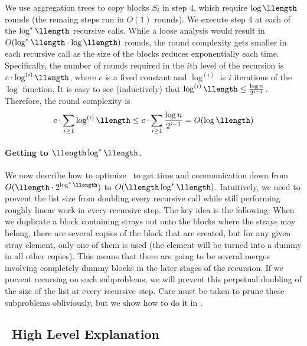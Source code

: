 We use aggregation trees to copy blocks $S_i$ in step $4$, which require $\log\llength$ rounds (the remaing steps run in $O(1)$ rounds).
We execute step 4 at each of the $\log^*\llength$ recursive calls.
While a loose analysis would result in $O(\log^*\llength\cdot\log\llength)$ rounds, the round complexity gets smaller in each recursive call as the size of the blocks reduces exponentially each time. Specifically, the number of rounds required in the $i$th level of the recursion is $c\cdot\log^{(i)}\llength$, where $c$ is a fixed constant and $\log^{(i)}$ is $i$ iterations of the $\log$ function. It is easy to see (inductively) that $\log^{(i)}\llength \le \frac{\log n}{2^{i-1}}$. Therefore, the round complexity is
$$c\cdot\sum_{i\ge 1}\log^{(i)}\llength \le c\cdot\sum_{i\ge 1}\frac{\log n}{2^{i-1}} = O(\log\llength)$$


\paragraph{Getting to $\llength\log^{*}\llength$.} We now describe how to optimize \ourprotocol\ to get time and communication down from $O(\llength\cdot 2^{\log^*\llength})$ to $O(\llength\log^*\llength)$. Intuitively, we need to prevent the list size from doubling every recursive call while still performing roughly linear work in every recursive step. The key idea is the following: When we duplicate a block containing strays out onto the blocks where the strays may belong, there are several copies of the block that are created, but for any given stray element, only one of them is used (the element will be turned into a dummy in all other copies). This means that there are going to be several merges involving completely dummy blocks in the later stages of the recursion. If we prevent recursing on such subproblems, we will prevent this perpetual doubling of the size of the list at every recursive step. Care must be taken to prune these subproblems obliviously, but we show how to do it in .


\subsection{\ourapproachtwo\ High Level Explanation}\label{sec:ourapproachtwooverview}

